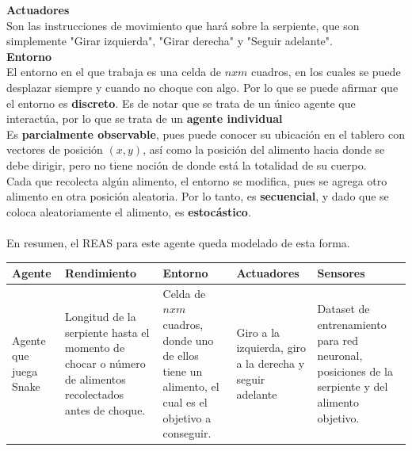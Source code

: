 \documentclass[12pt]{article}
\begin{document}
        {\bf Actuadores}\\
        
        Son las instrucciones de movimiento que hará sobre la serpiente, que son simplemente "Girar izquierda", "Girar derecha" y "Seguir adelante".\\
        
        {\bf Entorno}\\
        
        El entorno en el que trabaja es una celda de $n x m$ cuadros, en los cuales se puede desplazar siempre y cuando no choque con algo. Por lo que se puede afirmar que el entorno es {\bf discreto}. Es de notar que se trata de un único agente que interactúa, por lo que se trata de un {\bf agente individual}\\
        
        Es {\bf parcialmente observable}, pues puede conocer su ubicación en el tablero con vectores de posición $(x, y)$, así como la posición del alimento hacia donde se debe dirigir, pero no tiene noción de donde está la totalidad de su cuerpo.\\
        
        Cada que recolecta algún alimento, el entorno se modifica, pues se agrega otro alimento en otra posición aleatoria. Por lo tanto, es {\bf secuencial}, y dado que se coloca aleatoriamente el alimento, es {\bf estocástico}.\\ \\
        
        En resumen, el REAS para este agente queda modelado de esta forma.
        
        \begin{table}[h]
            \begin{tabular}{|p{1.1cm}|p{4.5cm}|p{2.3cm}|p{2.5cm}|p{2.5cm}|}\hline
            
            Agente & Rendimiento & Entorno & Actuadores & Sensores \\ \hline\hline
            
            Agente que juega Snake  & Longitud de la serpiente hasta el momento de chocar o número de alimentos recolectados antes de choque. & Celda de $n x m$ cuadros, donde uno de ellos tiene un alimento, el cual es el objetivo a conseguir. & Giro a la izquierda, giro a la derecha y seguir adelante &  Dataset de entrenamiento para red neuronal, posiciones de la serpiente y del alimento objetivo. \\ \hline
            \end{tabular}
        \end{table}
        
\end{document}
